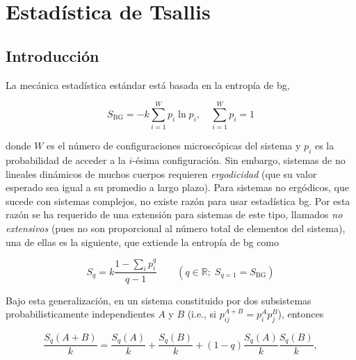 \chapter{Estadística de Tsallis}\label{ch-Tsallis}


\section{Introducción}

La mecánica estadística estándar está basada en la entropía de \acrfull{bg}, 

\begin{equation}
{S}_{\mathrm{BG}} = - k \sum_{i=1}^{W} {p}_{i} \ln {p}_{i}, \quad \sum_{i=1}^{W} {p}_{i} = 1
\end{equation}

donde $W$ es el número de configuraciones microscópicas del sistema y ${p}_{i}$ es la probabilidad de acceder a la $i$-ésima configuración. Sin embargo, sistemas de no lineales dinámicos de muchos cuerpos requieren \emph{ergodicidad} (que su valor esperado sea igual a su promedio a largo plazo). Para sistemas no ergódicos, que sucede con sistemas complejos, no existe razón para usar estadística \acrshort{bg}. Por esta razón se ha requerido de una extensión para sistemas de este tipo, llamados \emph{no extensivos} (pues no son proporcional al número total de elementos del sistema), una de ellas es la siguiente, que extiende la entropía de \acrshort{bg} como

\begin{equation}
{S}_{q} = k \frac{1-\sum_{i} {p}_{i}^{q}}{q-1} \qquad (q\in \mathbb{R};\; {S}_{q=1} = {S}_{\mathrm{BG}})
\end{equation}

Bajo esta generalización, en un sistema constituido por dos subsistemas probabilisticamente independientes $A$ y $B$ (i.e., si ${p}_{ij}^{A+B} = {p}_{i}^{A}{p}_{j}^{B}$), entonces

\begin{equation}\label{eq-TsallisTwoSystems}
\frac{{S}_{{q}}(A+B)}{k} = \frac{{S}_{q}(A)}{k} + \frac{{S}_{q}(B)}{k} + (1 - q) \frac{{S}_{q}(A)}{k}\frac{{S}_{q}(B)}{k},
\end{equation}

